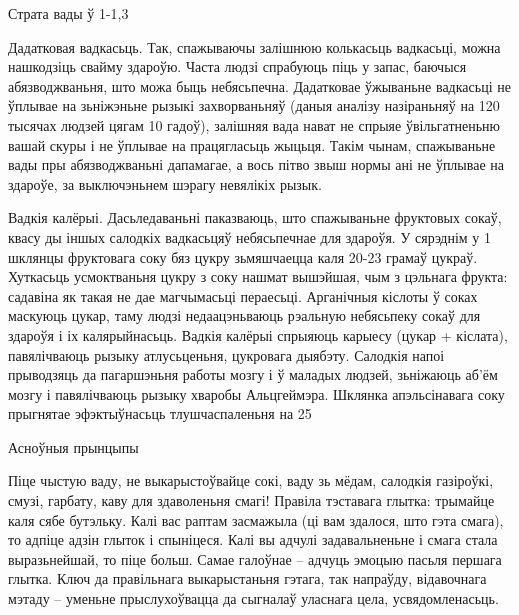 Страта вады ў 1-1,3%

Дадатковая вадкасьць.
Так, спажываючы залішнюю колькасьць вадкасьці, можна нашкодзіць свайму здароўю. Часта людзі спрабуюць піць у запас, баючыся абязводжваньня, што можа быць небясьпечна. Дадатковае ўжываньне вадкасьці не ўплывае на зьніжэньне рызыкі захворваньняў (даныя аналізу назіраньняў на 120 тысячах людзей цягам 10 гадоў), залішняя вада нават не спрыяе ўвільгатненьню вашай скуры і не ўплывае на працягласьць жыцьця. Такім чынам, спажываньне вады пры абязводжваньні дапамагае, а вось пітво звыш нормы ані не ўплывае на здароўе, за выключэньнем шэрагу невялікіх рызык.

Вадкія калёрыі.
Дасьледаваньні паказваюць, што спажываньне фруктовых сокаў, квасу ды іншых салодкіх вадкасьцяў небясьпечнае для здароўя. У сярэднім у 1 шклянцы фруктовага соку бяз цукру зьмяшчаецца каля 20-23 грамаў цукраў. Хуткасьць усмоктваньня цукру з соку нашмат вышэйшая, чым з цэльнага фрукта: садавіна як такая не дае магчымасьці пераесьці. Арганічныя кіслоты ў соках маскуюць цукар, таму людзі недаацэньваюць рэальную небясьпеку сокаў для здароўя і іх калярыйнасьць. Вадкія калёрыі спрыяюць карыесу (цукар + кіслата), павялічваюць рызыку атлусьценьня, цукровага дыябэту. Салодкія напоі прыводзяць да пагаршэньня работы мозгу і ў маладых людзей, зьніжаюць аб'ём мозгу і павялічваюць рызыку хваробы Альцгеймэра. Шклянка апэльсінавага соку прыгнятае эфэктыўнасьць тлушчаспаленьня на 25%

Асноўныя прынцыпы

Піце чыстую ваду, не выкарыстоўвайце сокі, ваду зь мёдам, салодкія газіроўкі, смузі, гарбату, каву для здаволеньня смагі!
Правіла тэставага глытка: трымайце каля сябе бутэльку.
Калі вас раптам засмажыла (ці вам здалося, што гэта смага), то адпіце адзін глыток і спыніцеся. Калі вы адчулі задавальненьне і смага стала выразьнейшай, то піце больш. Самае галоўнае – адчуць эмоцыю пасьля першага глытка. Ключ да правільнага выкарыстаньня гэтага, так напраўду, відавочнага мэтаду – уменьне прыслухоўвацца да сыгналаў уласнага цела, усвядомленасьць.

